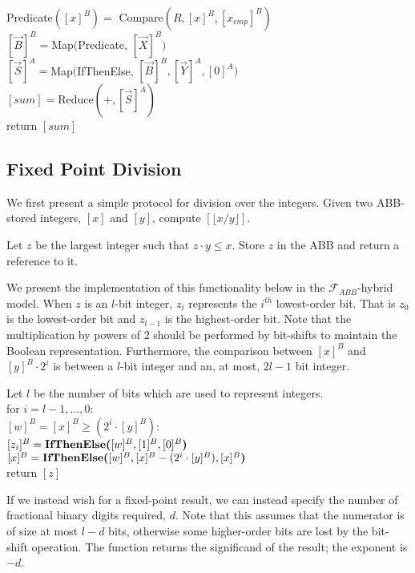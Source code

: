 \begin{protocol}[SubsetSum$(R, {[\vec{X}]^B}, {[\vec{Y}]^A}, {[x_{cmp}]^B})$]
	Predicate$([x]^B) = $ Compare$(R, [x]^B, [x_{cmp}]^B)$\\
	$[\vec{B}]^{B} = $Map$($Predicate, $[\vec{X}]^B)$\\
	$[\vec{S}]^{A} = $Map$($IfThenElse, $[\vec{B}]^B, [\vec{Y}]^A, [0]^A)$\\
	$[sum] = $Reduce$(+, [\vec{S}]^A)$\\
	return $[sum]$
\end{protocol}


\subsection{Fixed Point Division}

We first present a simple protocol for division over the integers.
Given two ABB-stored integers, $[x]$ and $[y]$, compute $[\lfloor x/y \rfloor]$.

\begin{functionality}[Divide$({[x]^B}, {[y]^B})$]
	Let $z$ be the largest integer such that $z \cdot y \leq x$. 
	Store $z$ in the ABB and return a reference to it.
\end{functionality}

We present the implementation of this functionality below in the 
$\mathcal{F}_{ABB}$-hybrid model. 
When $z$ is an $l$-bit integer, $z_i$ represents the $i^{th}$ lowest-order bit.
That is $z_0$ is the lowest-order bit and $z_{l-1}$ is the highest-order bit.
Note that the multiplication by powers of 2 should be performed by bit-shifts
to maintain the Boolean representation.
Furthermore, the comparison between $[x]^B$ and $[y]^B \cdot 2^i$ is
between a $l$-bit integer and an, at most, $2l-1$ bit integer. 

\begin{protocol}[Divide$({[x]^B}, {[y]^B})$]
	Let $l$ be the number of bits which are used to represent integers.\\	
	for $i = l-1, \ldots, 0$:\\
	\indent	$[w]^B = [x]^B \geq (2^i \cdot [y]^B)$:\\
	\indent	$[z_i]^B = \textbf{IfThenElse(}[w]^B, [1]^B, [0]^B\textbf{)}$\\
	\indent	$[x]^B = \textbf{IfThenElse(}[w]^B, [x]^B - (2^i \cdot [y]^B), [x]^B\textbf{)}$\\
	return $[z]$
\end{protocol}

If we instead wish for a fixed-point result, 
we can instead specify the number of fractional binary digits required, $d$.
Note that this assumes that the numerator is of size at most $l - d$ bits,
otherwise some higher-order bits are lost by the bit-shift operation.
The function returns the significand of the result; the exponent is $-d$. 

